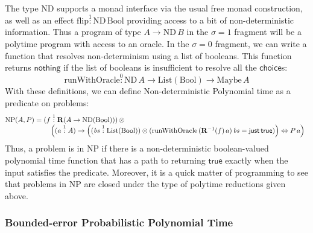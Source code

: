 \documentclass[acmsmall,screen]{acmart}
\newcommand{\BoolTy}{\mathrm{Bool}}
\newcommand{\cTrue}{\mathsf{true}}
\newcommand{\ListTy}{\mathrm{List}}
\begin{document}
The type $\mathrm{ND}$ supports a monad interface via the usual free
monad construction, as well as an effect
$\mathrm{flip} \stackrel1: \mathrm{ND}\,\BoolTy$ providing access to a
bit of non-deterministic information. Thus a program of type
$A \to \mathrm{ND}\,B$ in the $\sigma = 1$ fragment will be a polytime
program with access to an oracle. In the $\sigma = 0$ fragment, we can
write a function that resolves non-determinism using a list of
booleans. This function returns $\mathsf{nothing}$ if the list of
booleans is insufficient to resolve all the $\mathsf{choice}$s:
\begin{displaymath}
  \mathrm{runWithOracle} \stackrel0: \mathrm{ND}\,A \to \ListTy(\BoolTy) \to \mathrm{Maybe}\,A
\end{displaymath}
With these definitions, we can define Non-deterministic Polynomial
time as a predicate on problems:
\begin{displaymath}
  \mathrm{NP}(A,P) =
  \begin{array}[t]{@{}l}
    (f \stackrel1: \mathbf{R}(A \to \mathrm{ND}(\BoolTy)))\, \otimes \\
    \quad \left((a \stackrel1: A) \to \left((\mathit{bs} \stackrel1: \ListTy(\BoolTy)) \otimes (\mathrm{runWithOracle}\,(\mathbf{R}^{-1}(f)\,a)\,\mathit{bs} = \mathsf{just}\,\cTrue)\right) \Leftrightarrow P\,a\right)
  \end{array}
\end{displaymath}
Thus, a problem is in NP if there is a non-deterministic
boolean-valued polynomial time function that has a path to returning
$\cTrue$ exactly when the input satisfies the predicate. Moreover, it is a
quick matter of programming to see that problems in NP are closed
under the type of polytime reductions given above.

\subsubsection{Bounded-error Probabilistic Polynomial Time}
\end{document}

